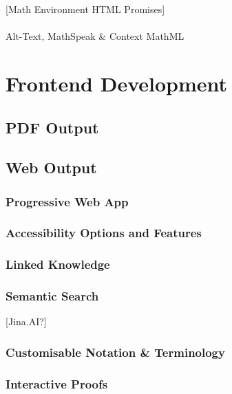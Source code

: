 \documentclass[
  british,
]{article}
\makeatletter
\let\oldparagraph\paragraph
\renewcommand{\paragraph}{
    \@ifstar
      \xxxParagraphStar
      \xxxParagraphNoStar
  }
\newcommand{\xxxParagraphStar}[1]{\oldparagraph*{#1}\mbox{}}
\newcommand{\xxxParagraphNoStar}[1]{\oldparagraph{#1}\mbox{}}
\makeatother
\begin{document}
{[}Math Environment HTML Promises{]}

\paragraph{Alt-Text, MathSpeak \& Context
MathML}\label{alt-text-mathspeak-context-mathml}

\section{Frontend Development}\label{frontend-development}

\subsection{PDF Output}\label{pdf-output}

\subsection{Web Output}\label{web-output}

\subsubsection{Progressive Web App}\label{progressive-web-app}

\subsubsection{Accessibility Options and
Features}\label{accessibility-options-and-features}

\subsubsection{Linked Knowledge}\label{linked-knowledge}

\subsubsection{Semantic Search}\label{semantic-search}

{[}Jina.AI?{]}

\subsubsection{Customisable Notation \&
Terminology}\label{customisable-notation-terminology}

\subsubsection{Interactive Proofs}\label{interactive-proofs}
\end{document}

